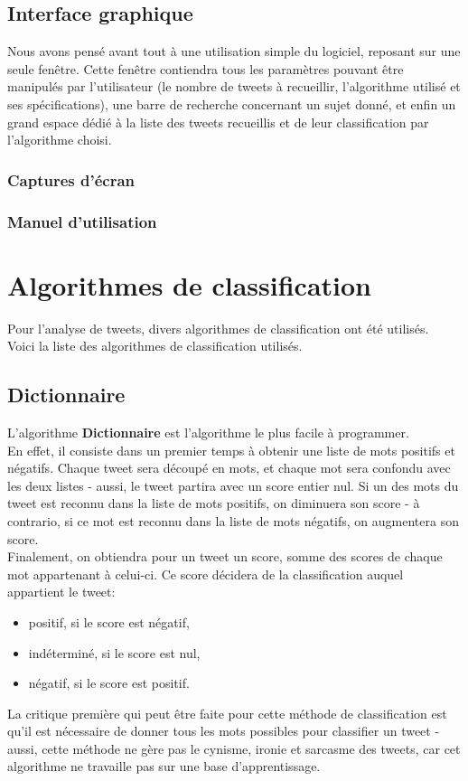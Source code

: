 \documentclass[pdftex,12pt,a4paper]{report}
\begin{document}
\begin{spacing}{1.2}
\section{Interface graphique}

Nous avons pensé avant tout à une utilisation simple du logiciel, reposant sur une seule fenêtre. Cette fenêtre contiendra tous les paramètres pouvant être manipulés par l'utilisateur (le nombre de tweets à recueillir, l'algorithme utilisé et ses spécifications), une barre de recherche concernant un sujet donné, et enfin un grand espace dédié à la liste des tweets recueillis et de leur classification par l'algorithme choisi.

\subsection{Captures d'écran}

\subsection{Manuel d'utilisation}

\chapter{Algorithmes de classification}

Pour l'analyse de tweets, divers algorithmes de classification ont été utilisés.\\
Voici la liste des algorithmes de classification utilisés.

\section{Dictionnaire}

L'algorithme \textbf{Dictionnaire} est l'algorithme le plus facile à programmer.\\
En effet, il consiste dans un premier temps à obtenir une liste de mots positifs et négatifs. Chaque tweet sera découpé en mots, et chaque mot sera confondu avec les deux listes - aussi, le tweet partira avec un score entier nul. Si un des mots du tweet est reconnu dans la liste de mots positifs, on diminuera son score - à contrario, si ce mot est reconnu dans la liste de mots négatifs, on augmentera son score.\\
Finalement, on obtiendra pour un tweet un score, somme des scores de chaque mot appartenant à celui-ci. Ce score décidera de la classification auquel appartient le tweet:
\begin{itemize}
\item{positif, si le score est négatif,}
\item{indéterminé, si le score est nul,}
\item{négatif, si le score est positif.}
\end{itemize}
La critique première qui peut être faite pour cette méthode de classification est qu'il est nécessaire de donner tous les mots possibles pour classifier un tweet - aussi, cette méthode ne gère pas le cynisme, ironie et sarcasme des tweets, car cet algorithme ne travaille pas sur une base d'apprentissage.


\end{spacing}
\end{document}
